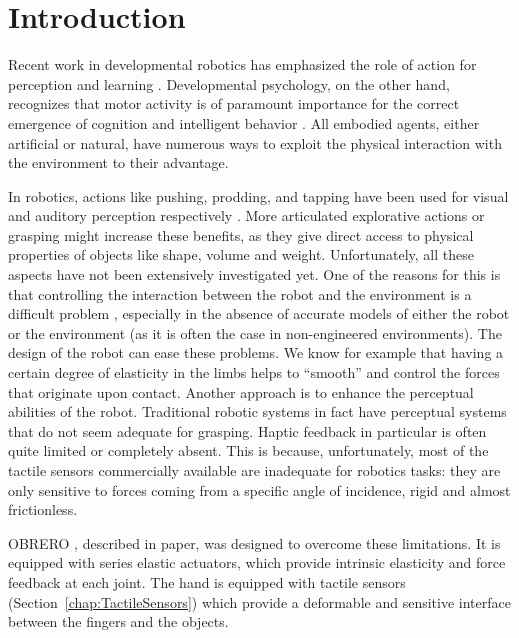 

%
\section{Introduction}
%
Recent work in developmental robotics has emphasized the role of
action for perception and learning
\cite{metta03early,natale04learning,natale05from}. Developmental
psychology, on the other hand, recognizes that motor activity is
of paramount importance for the correct emergence of cognition and
intelligent behavior
\cite{gibson88explore,streri93Seeing,bushnell93motor,hofsten04motor}.
All embodied agents, either artificial or natural, have numerous
ways to exploit the physical interaction with the environment to
their advantage.

In robotics, actions like pushing, prodding, and tapping have been
used for visual and auditory perception respectively
\cite{metta03early,etorresjara05tapping}. More articulated
explorative actions or grasping might increase these benefits, as
they give direct access to physical properties of objects like
shape, volume and weight.
%
Unfortunately, all these aspects have not been extensively
investigated yet. One of the reasons for this is that controlling
the interaction between the robot and the environment is a
difficult problem \cite{volpe90real}, especially in the absence of
accurate models of either the robot or the environment (as it is
often the case in non-engineered environments).
%
The design of the robot can ease these problems. We know for
example that having a certain degree of elasticity in the limbs
helps to ``smooth''  and control the forces that originate upon
contact. Another approach is to enhance the perceptual abilities
of the robot. Traditional robotic systems in fact have perceptual
systems that do not seem adequate for grasping. Haptic feedback in
particular is often quite limited or completely absent. This is
because, unfortunately, most of the tactile sensors commercially
available are inadequate for robotics tasks: they are only
sensitive to forces coming from a specific angle of incidence,
rigid and almost frictionless.

OBRERO \cite{obrero}, described in paper, was designed to overcome
these limitations. It is equipped with series elastic actuators,
which provide intrinsic elasticity and force feedback at each
joint. The hand is equipped with tactile sensors
(Section~\ref{chap:TactileSensors}) which provide a deformable and
sensitive interface between the fingers and the objects.

